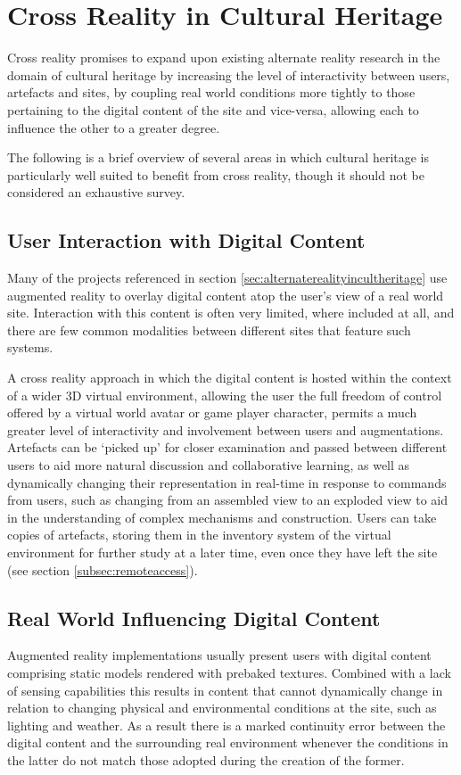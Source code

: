 \documentclass{sig-alternate}
\begin{document}
{\section{Cross Reality in Cultural Heritage}
\label{sec:crossrealityincultheritage}
Cross reality promises to expand upon existing alternate reality research in the domain of cultural heritage by increasing the level of interactivity between users, artefacts and sites, by coupling real world conditions more tightly to those pertaining to the digital content of the site and vice-versa, allowing each to influence the other to a greater degree.

The following is a brief overview of several areas in which cultural heritage is particularly well suited to benefit from cross reality, though it should not be considered an exhaustive survey.

\subsection{User Interaction with Digital Content}
\label{subsec:userinteraction}
Many of the projects referenced in section \ref{sec:alternaterealityincultheritage} use augmented reality to overlay digital content atop the user's view of a real world site. Interaction with this content is often very limited, where included at all, and there are few common modalities between different sites that feature such systems.

A cross reality approach in which the digital content is hosted within the context of a wider 3D virtual environment, allowing the user the full freedom of control offered by a virtual world avatar or game player character, permits a much greater level of interactivity and involvement between users and augmentations. Artefacts can be `picked up' for closer examination and passed between different users to aid more natural discussion and collaborative learning, as well as dynamically changing their representation in real-time in response to commands from users, such as changing from an assembled view to an exploded view to aid in the understanding of complex mechanisms and construction. Users can take copies of artefacts, storing them in the inventory system of the virtual environment for further study at a later time, even once they have left the site (see section \ref{subsec:remoteaccess}).

\subsection{Real World Influencing Digital Content}
Augmented reality implementations usually present users with digital content comprising static models rendered with prebaked textures. Combined with a lack of sensing capabilities this results in content that cannot dynamically change in relation to changing physical and environmental conditions at the site, such as lighting and weather. As a result there is a marked continuity error between the digital content and the surrounding real environment whenever the conditions in the latter do not match those adopted during the creation of the former.

}
\end{document}
